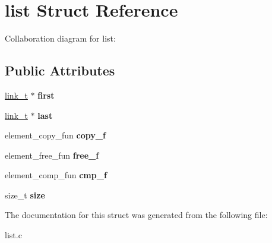 \hypertarget{structlist}{}\section{list Struct Reference}
\label{structlist}


Collaboration diagram for list\+:
\subsection*{Public Attributes}
\begin{DoxyCompactItemize}
\item 
\hyperlink{structlink}{link\+\_\+t} $\ast$ {\bfseries first}\hypertarget{structlist_a8b3138e762449dc038dfa560f02f5f96}{}\label{structlist_a8b3138e762449dc038dfa560f02f5f96}

\item 
\hyperlink{structlink}{link\+\_\+t} $\ast$ {\bfseries last}\hypertarget{structlist_a05a1dc6800f93b4e20b872a397ab396f}{}\label{structlist_a05a1dc6800f93b4e20b872a397ab396f}

\item 
element\+\_\+copy\+\_\+fun {\bfseries copy\+\_\+f}\hypertarget{structlist_acd5def2fe519248ad24e10b426acd44f}{}\label{structlist_acd5def2fe519248ad24e10b426acd44f}

\item 
element\+\_\+free\+\_\+fun {\bfseries free\+\_\+f}\hypertarget{structlist_a28ae85a352de920c1bcc353411bac5fe}{}\label{structlist_a28ae85a352de920c1bcc353411bac5fe}

\item 
element\+\_\+comp\+\_\+fun {\bfseries cmp\+\_\+f}\hypertarget{structlist_a3e595459af1efe57e5929c7a48c1cb1c}{}\label{structlist_a3e595459af1efe57e5929c7a48c1cb1c}

\item 
size\+\_\+t {\bfseries size}\hypertarget{structlist_ae581be90bd8eb7051528b61ad216de88}{}\label{structlist_ae581be90bd8eb7051528b61ad216de88}

\end{DoxyCompactItemize}


The documentation for this struct was generated from the following file\+:\begin{DoxyCompactItemize}
\item 
list.\+c\end{DoxyCompactItemize}
